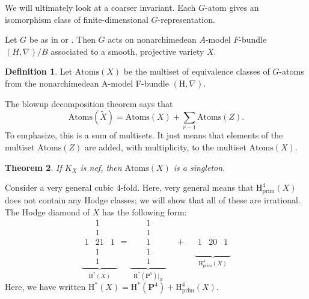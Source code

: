 \documentclass[11pt, reqno]{amsart}
\numberwithin{equation}{section}
\theoremstyle{plain}
\newtheorem{theorem}{Theorem}[section]
\theoremstyle{definition}
\newtheorem{definition}[theorem]{Definition}
\theoremstyle{italicsname}
\newcommand{\prim}{\mathrm{prim}}
\newcommand{\Atoms}{\mathrm{Atoms}}
\newcommand{\rH}{\mathrm{H}}
\newcommand{\bP}{\mathbf{P}}
\begin{document}
We will ultimately look at a coarser invariant. Each $G$-atom gives an isomorphism class of finite-dimensional $G$-representation. 

Let $G$ be as in  or . 
Then $G$ acts on nonarchimedean $A$-model $F$-bundle $(H, \nabla)/B$ associated to a smooth, projective variety $X$. 

\begin{definition}
\label{def:atoms}
    Let $\Atoms(X)$ be the multiset of equivalence classes of $G$-atoms from the nonarchimedean A-model F-bundle $(\rH, \nabla)$. 
\end{definition}

The blowup decomposition theorem says that
\begin{equation}
\label{blowup_atoms}
    \Atoms(\tilde X) = \Atoms(X) + \sum_{r - 1} \Atoms(Z).
\end{equation}
To emphasize, this is a sum of multisets. It just means that elements of the multiset $\Atoms(Z)$ are added, with multiplicity, to the multiset $\Atoms(X)$.

\begin{theorem}
\label{thm:main_theorem}
    If $K_X$ is nef, then $\Atoms(X)$ is a singleton. 
\end{theorem}

Consider a very general cubic $4$-fold. 
Here, very general means that $\rH^4_{\prim}(X)$ does not contain any Hodge classes; we will show that all of these are irrational.
The Hodge diamond of $X$ has the following form:
\[
    \underbrace{\begin{array}{ccc}
        & 1 \\
        & 1 \\
        1 & 21 & 1 \\
        & 1 \\
        & 1 
    \end{array}}_{\rH^*(X)} =
    \underbrace{\begin{array}{ccccc}
       & & 1 \\
       & & 1 \\
       & & 1 & & \\
       & & 1 \\
       & & 1 
    \end{array}}_{\rH^*(\bP^5)|_{X}} \quad + \quad \underbrace{\begin{array}{ccc}
        \\
        \\
        1 & 20 & 1 \\
        \\
        &
    \end{array}}_{\rH^4_{\prim}(X)}
\]
Here, we have written $\rH^*(X) = \rH^*(\bP^4) + \rH^4_{\prim}(X)$. 
\end{document}
